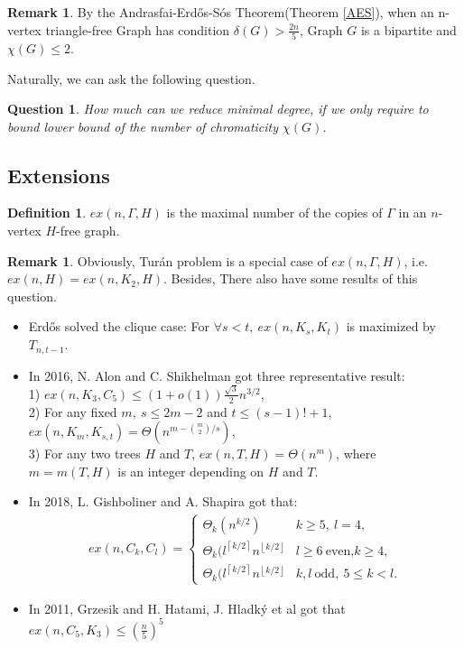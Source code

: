 \documentclass{article}
\newtheorem{question}[theorem]{Question}
\theoremstyle{definition}
\newtheorem{remark}[theorem]{Remark}
\newtheorem{definition}[theorem]{Definition}
\def\Erdos{Erd\H{o}s}
\def\Turan{Tur\'an}
\begin{document}
\begin{remark}
    By the Andrasfai-\Erdos{}-S\'os Theorem(Theorem \ref{AES}), when an n-vertex triangle-free Graph has condition $\delta(G) > \frac{2n}{5}$, Graph $G$ is a bipartite and $\chi(G) \le 2$.
\end{remark}

Naturally, we can ask the following question.

\begin{question}
    How much can we reduce minimal degree, if we only require to bound lower bound of the number of chromaticity $\chi(G)$.
\end{question}

\subsection{Extensions}
\begin{definition}
    $ex(n,\Gamma,H)$ is the maximal number of the copies of $\Gamma$ in an $n$-vertex $H$-free graph.
\end{definition}
\begin{remark}
     Obviously, \Turan{} problem is a special case of $ex(n,\Gamma,H)$, i.e. $ex(n,H) = ex(n,K_2,H)$. Besides, There also have some results of this question.
\begin{itemize}
    \item \Erdos{}\cite{MR0151956} solved the clique case: For $\forall s < t,~ex(n,K_s,K_t)$ is maximized by $T_{n,t-1}$.
    \item In 2016, N. Alon and C. Shikhelman\cite{ALON2016146} got three representative result:
	\\ 1) $ex(n,K_3,C_5) \le (1+o(1))\frac{\sqrt{3}}{2}n^{3/2}$,
	\\ 2) For any fixed $m,~s \le 2m-2$ and $t \le (s-1)!+1$, $ex(n,K_m,K_{s,t})=\Theta(n^{m-\binom{m}{2}/s})$,
	\\ 3) For any two trees $H$ and $T$, $ex(n,T,H)=\Theta(n^m)$, where $m=m(T,H)$ is an integer depending on $H$ and $T$.
    \item In 2018, L. Gishboliner and A. Shapira \cite{inproceedings} got that:
\begin{align*}
	ex(n,C_k,C_l)=\left\{
	\begin{array}{llllllllll}
		{\Theta_k(n^{k/2})} & {k \ge 5,~l=4,} \\
		{\Theta_k(l^{\left\lceil k/2 \right\rceil}n^{\left\lfloor k/2 \right\rfloor}} & {l\ge 6~\text{even,} k\ge 4,}\\
		{\Theta_k(l^{\left\lceil k/2 \right\rceil}n^{\left\lfloor k/2 \right\rfloor}} & {k,l~\text{odd},~5\le k <l.}
	\end{array}\right.
\end{align*}
    \item In 2011, Grzesik \cite{Grzesik2011OnTM} and H. Hatami, J. Hladký et al \cite{HATAMI2013722} got that $ex(n,C_5,K_3) \le (\frac{n}{5})^5$
\end{itemize}
\end{remark}
\end{document}
